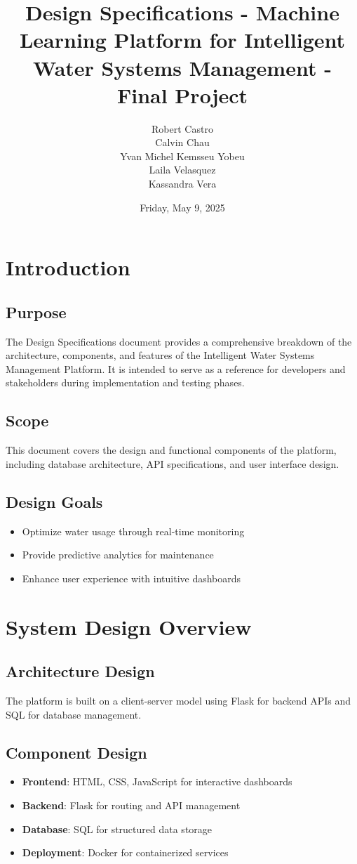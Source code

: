 \documentclass{article}
\title{Design Specifications - Machine Learning Platform for Intelligent Water Systems Management - Final Project}
\author{Robert Castro\\
Calvin Chau\\
Yvan Michel Kemsseu Yobeu\\
Laila Velasquez\\
Kassandra Vera}
\date{Friday, May 9, 2025}
\begin{document}
\maketitle
\pagebreak

\tableofcontents
\newpage

\section{Introduction}
\subsection{Purpose}
The Design Specifications document provides a comprehensive breakdown of the architecture, components, and features of the Intelligent Water Systems Management Platform. It is intended to serve as a reference for developers and stakeholders during implementation and testing phases.

\subsection{Scope}
This document covers the design and functional components of the platform, including database architecture, API specifications, and user interface design.

\subsection{Design Goals}
\begin{itemize}
\item Optimize water usage through real-time monitoring
\item Provide predictive analytics for maintenance
\item Enhance user experience with intuitive dashboards
\end{itemize}

\section{System Design Overview}
\subsection{Architecture Design}
The platform is built on a client-server model using Flask for backend APIs and SQL for database management.

\subsection{Component Design}
\begin{itemize}
\item \textbf{Frontend}: HTML, CSS, JavaScript for interactive dashboards
\item \textbf{Backend}: Flask for routing and API management
\item \textbf{Database}: SQL for structured data storage
\item \textbf{Deployment}: Docker for containerized services
\end{itemize}
\end{document}
